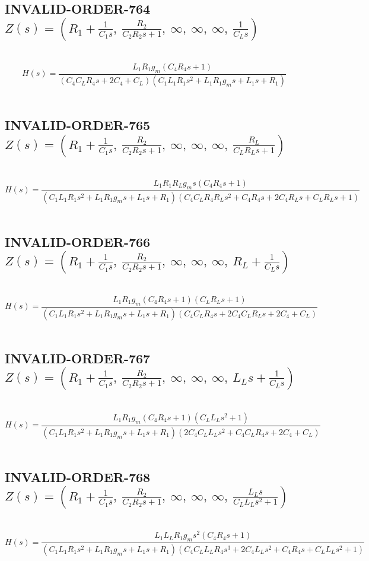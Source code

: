 \documentclass{article}
\begin{document}
\subsection{INVALID-ORDER-764 $Z(s) = \left( R_{1} + \frac{1}{C_{1} s}, \  \frac{R_{2}}{C_{2} R_{2} s + 1}, \  \infty, \  \infty, \  \infty, \  \frac{1}{C_{L} s}\right)$ } \ 
\textbf{\[H(s) = \frac{L_{1} R_{1} g_{m} \left(C_{4} R_{4} s + 1\right)}{\left(C_{4} C_{L} R_{4} s + 2 C_{4} + C_{L}\right) \left(C_{1} L_{1} R_{1} s^{2} + L_{1} R_{1} g_{m} s + L_{1} s + R_{1}\right)}\] } \ 
\subsection{INVALID-ORDER-765 $Z(s) = \left( R_{1} + \frac{1}{C_{1} s}, \  \frac{R_{2}}{C_{2} R_{2} s + 1}, \  \infty, \  \infty, \  \infty, \  \frac{R_{L}}{C_{L} R_{L} s + 1}\right)$ } \ 
\textbf{\[H(s) = \frac{L_{1} R_{1} R_{L} g_{m} s \left(C_{4} R_{4} s + 1\right)}{\left(C_{1} L_{1} R_{1} s^{2} + L_{1} R_{1} g_{m} s + L_{1} s + R_{1}\right) \left(C_{4} C_{L} R_{4} R_{L} s^{2} + C_{4} R_{4} s + 2 C_{4} R_{L} s + C_{L} R_{L} s + 1\right)}\] } \ 
\subsection{INVALID-ORDER-766 $Z(s) = \left( R_{1} + \frac{1}{C_{1} s}, \  \frac{R_{2}}{C_{2} R_{2} s + 1}, \  \infty, \  \infty, \  \infty, \  R_{L} + \frac{1}{C_{L} s}\right)$ } \ 
\textbf{\[H(s) = \frac{L_{1} R_{1} g_{m} \left(C_{4} R_{4} s + 1\right) \left(C_{L} R_{L} s + 1\right)}{\left(C_{1} L_{1} R_{1} s^{2} + L_{1} R_{1} g_{m} s + L_{1} s + R_{1}\right) \left(C_{4} C_{L} R_{4} s + 2 C_{4} C_{L} R_{L} s + 2 C_{4} + C_{L}\right)}\] } \ 
\subsection{INVALID-ORDER-767 $Z(s) = \left( R_{1} + \frac{1}{C_{1} s}, \  \frac{R_{2}}{C_{2} R_{2} s + 1}, \  \infty, \  \infty, \  \infty, \  L_{L} s + \frac{1}{C_{L} s}\right)$ } \ 
\textbf{\[H(s) = \frac{L_{1} R_{1} g_{m} \left(C_{4} R_{4} s + 1\right) \left(C_{L} L_{L} s^{2} + 1\right)}{\left(C_{1} L_{1} R_{1} s^{2} + L_{1} R_{1} g_{m} s + L_{1} s + R_{1}\right) \left(2 C_{4} C_{L} L_{L} s^{2} + C_{4} C_{L} R_{4} s + 2 C_{4} + C_{L}\right)}\] } \ 
\subsection{INVALID-ORDER-768 $Z(s) = \left( R_{1} + \frac{1}{C_{1} s}, \  \frac{R_{2}}{C_{2} R_{2} s + 1}, \  \infty, \  \infty, \  \infty, \  \frac{L_{L} s}{C_{L} L_{L} s^{2} + 1}\right)$ } \ 
\textbf{\[H(s) = \frac{L_{1} L_{L} R_{1} g_{m} s^{2} \left(C_{4} R_{4} s + 1\right)}{\left(C_{1} L_{1} R_{1} s^{2} + L_{1} R_{1} g_{m} s + L_{1} s + R_{1}\right) \left(C_{4} C_{L} L_{L} R_{4} s^{3} + 2 C_{4} L_{L} s^{2} + C_{4} R_{4} s + C_{L} L_{L} s^{2} + 1\right)}\] } \ 
\end{document}
